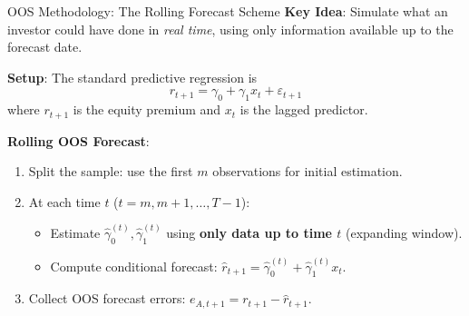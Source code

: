 \documentclass{beamer}
\begin{document}
\begin{frame}{OOS Methodology: The Rolling Forecast Scheme}
    \textbf{Key Idea}: Simulate what an investor could have done in \textit{real time}, using only information available up to the forecast date.

    \vspace{0.3cm}
    \textbf{Setup}: The standard predictive regression is
    \begin{equation}
        r_{t+1} = \gamma_0 + \gamma_1 x_t + \varepsilon_{t+1}
    \end{equation}
    where $r_{t+1}$ is the equity premium and $x_t$ is the lagged predictor.

    \vspace{0.3cm}
    \textbf{Rolling OOS Forecast}:
    \begin{enumerate}
        \item Split the sample: use the first $m$ observations for initial estimation.
        \item At each time $t$ ($t = m, m+1, \ldots, T-1$):
        \begin{itemize}
            \item Estimate $\hat{\gamma}_0^{(t)}, \hat{\gamma}_1^{(t)}$ using \textbf{only data up to time $t$} (expanding window).
            \item Compute conditional forecast: $\hat{r}_{t+1} = \hat{\gamma}_0^{(t)} + \hat{\gamma}_1^{(t)} x_t$.
        \end{itemize}
        \item Collect OOS forecast errors: $e_{A,t+1} = r_{t+1} - \hat{r}_{t+1}$.
    \end{enumerate}
\end{frame}
\end{document}
